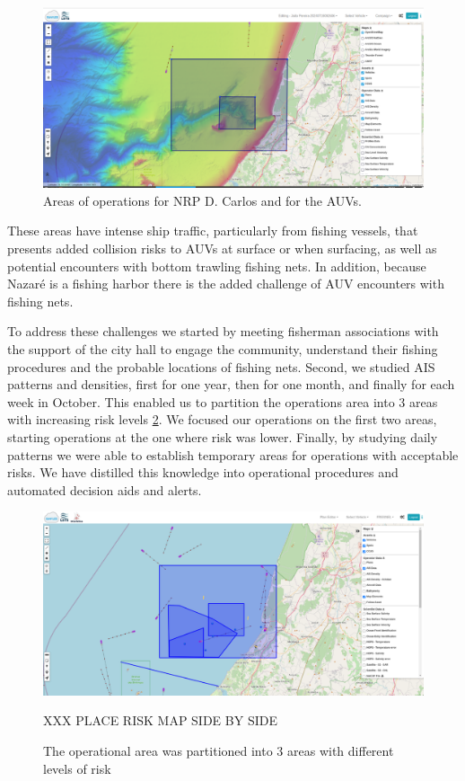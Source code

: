 \begin{figure}
    \centering
    \includegraphics[width=.7\linewidth]{fig/Opareaas.png}
    \caption{Areas of operations for NRP D. Carlos and for the AUVs.}
    \label{fig:opareas}
\end{figure}

These areas have intense ship traffic, particularly from fishing
vessels, that presents added collision risks to AUVs at surface or when
surfacing, as well as potential encounters with bottom trawling fishing
nets. In addition, because Nazaré is a fishing harbor there is the added
challenge of AUV encounters with fishing nets.

To address these challenges we started by meeting fisherman associations
with the support of the city hall to engage the community, understand
their fishing procedures and the probable locations of fishing nets.
Second, we studied AIS patterns and densities, first for one year, then
for one month, and finally for each week in October. This enabled us to
partition the operations area into 3 areas with increasing risk levels
\ref{fig:riskareas}. We focused our operations on the first two areas,
starting operations at the one where risk was lower. Finally, by
studying daily patterns we were able to establish temporary areas for
operations with acceptable risks. We have distilled this knowledge into
operational procedures and automated decision aids and alerts.

\begin{figure}
    \centering
    \includegraphics[width=.7\linewidth]{fig/riskareas.png}
    \caption{The operational area was partitioned into 3 areas with
      different levels of risk} XXX PLACE RISK MAP SIDE BY SIDE
    \label{fig:riskareas}
\end{figure}

